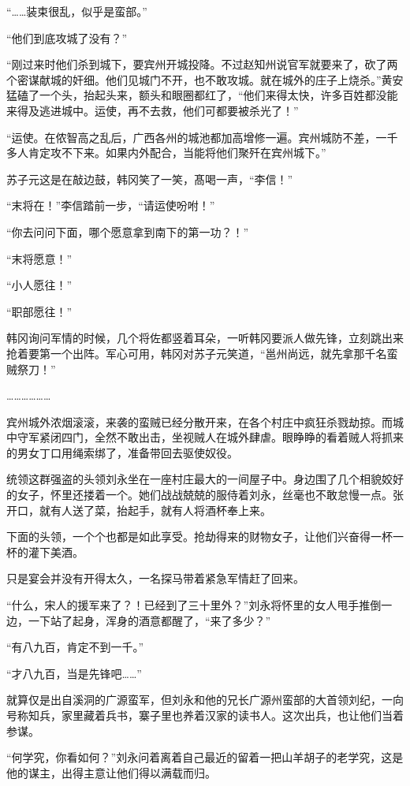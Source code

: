 “……装束很乱，似乎是蛮部。”

“他们到底攻城了没有？”

“刚过来时他们杀到城下，要宾州开城投降。不过赵知州说官军就要来了，砍了两个密谋献城的奸细。他们见城门不开，也不敢攻城。就在城外的庄子上烧杀。”黄安猛磕了一个头，抬起头来，额头和眼圈都红了，“他们来得太快，许多百姓都没能来得及逃进城中。运使，再不去救，他们可都要被杀光了！”

“运使。在侬智高之乱后，广西各州的城池都加高增修一遍。宾州城防不差，一千多人肯定攻不下来。如果内外配合，当能将他们聚歼在宾州城下。”

苏子元这是在敲边鼓，韩冈笑了一笑，髙喝一声，“李信！”

“末将在！”李信踏前一步，“请运使吩咐！”

“你去问问下面，哪个愿意拿到南下的第一功？！”

“末将愿意！”

“小人愿往！”

“职部愿往！”

韩冈询问军情的时候，几个将佐都竖着耳朵，一听韩冈要派人做先锋，立刻跳出来抢着要第一个出阵。军心可用，韩冈对苏子元笑道，“邕州尚远，就先拿那千名蛮贼祭刀！”

………………

宾州城外浓烟滚滚，来袭的蛮贼已经分散开来，在各个村庄中疯狂杀戮劫掠。而城中守军紧闭四门，全然不敢出击，坐视贼人在城外肆虐。眼睁睁的看着贼人将抓来的男女丁口用绳索绑了，准备带回去驱使奴役。

统领这群强盗的头领刘永坐在一座村庄最大的一间屋子中。身边围了几个相貌姣好的女子，怀里还搂着一个。她们战战兢兢的服侍着刘永，丝毫也不敢怠慢一点。张开口，就有人送了菜，抬起手，就有人将酒杯奉上来。

下面的头领，一个个也都是如此享受。抢劫得来的财物女子，让他们兴奋得一杯一杯的灌下美酒。

只是宴会并没有开得太久，一名探马带着紧急军情赶了回来。

“什么，宋人的援军来了？！已经到了三十里外？”刘永将怀里的女人甩手推倒一边，一下站了起身，浑身的酒意都醒了，“来了多少？”

“有八九百，肯定不到一千。”

“才八九百，当是先锋吧……”

就算仅是出自溪洞的广源蛮军，但刘永和他的兄长广源州蛮部的大首领刘纪，一向号称知兵，家里藏着兵书，寨子里也养着汉家的读书人。这次出兵，也让他们当着参谋。

“何学究，你看如何？”刘永问着离着自己最近的留着一把山羊胡子的老学究，这是他的谋主，出得主意让他们得以满载而归。

